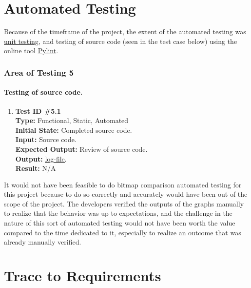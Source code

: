 \documentclass[12pt, titlepage]{article}
\begin{document}
\section{Automated Testing}
Because of the timeframe of the project, the extent of the automated testing was \hyperref[sec:unittest]{unit testing}, and testing of source code (seen in the test case below) using the online tool \href{https://www.pylint.org}{Pylint}.

\subsubsection{Area of Testing 5}		
	\paragraph{Testing of source code.}
		\begin{enumerate}
			\item{\textbf{Test ID \#5.1\\}}
			\textbf{Type:} Functional, Static, Automated\\
			\textbf{Initial State:} Completed source code. \\
			\textbf{Input:} Source code.\\
			\textbf{Expected Output:} Review of source code.\\
			\textbf{Output:}	 \href{run:code_eval.txt} {\underline{log-file}}.\\
			\textbf{Result:} N/A
		\end{enumerate}

It would not have been feasible to do bitmap comparison automated testing for this project because to do so correctly and accurately would have been out of the scope of the project. The developers verified the outputs of the graphs manually to realize that the behavior was up to expectations, and the challenge in the nature of this sort of automated testing would not have been worth the value compared to the time dedicated to it, especially to realize an outcome that was already manually verified.
		
\section{Trace to Requirements} %
\end{document}
